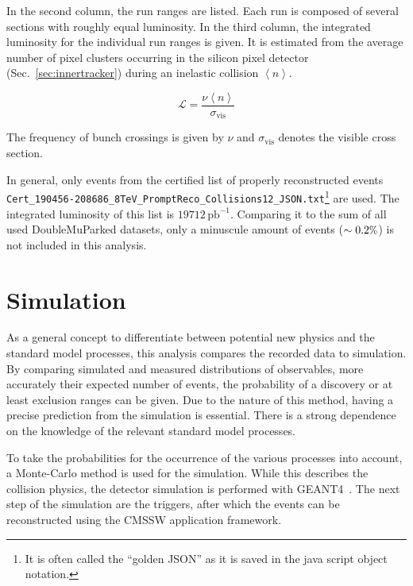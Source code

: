 In the second column, the run ranges are listed. Each run is composed of several sections with roughly equal luminosity. In the third column, the integrated luminosity for the individual run ranges is given. It is estimated from the average number of pixel clusters occurring in the silicon pixel detector (Sec.~\ref{sec:innertracker}) during an inelastic collision $\left< n \right>$.

\begin{equation}
  \label{eq:lumi}
  \mathcal{L} = \frac{\nu \left< n \right>}{\sigma_{\text{vis}}}
\end{equation}

\noindent The frequency of bunch crossings is given by $\nu$ and $\sigma_{\text{vis}}$ denotes the visible cross section. 

In general, only events from the certified list of properly reconstructed events \\ \verb+Cert_190456-208686_8TeV_PromptReco_Collisions12_JSON.txt+\footnote{It is often called the ``golden JSON'' as it is saved in the java script object notation.} are used. The integrated luminosity of this list is $19712\,\text{pb}^{-1}$. Comparing it to the sum of all used DoubleMuParked datasets, only a minuscule amount of events ($\sim 0.2\pct$) is not included in this analysis.

\section{Simulation}

As a general concept to differentiate between potential new physics and the standard model processes, this analysis compares the recorded data to simulation. By comparing simulated and measured distributions of observables, more accurately their expected number of events, the probability of a discovery or at least exclusion ranges can be given. Due to the nature of this method, having a precise prediction from the simulation is essential. There is a strong dependence on the knowledge of the relevant standard model processes.

To take the probabilities for the occurrence of the various processes into account, a Monte-Carlo method is used for the simulation. While this describes the collision physics, the detector simulation is performed with \textsc{GEANT4}~\cite{geant41,geant42}. The next step of the simulation are the triggers, after which the events can be reconstructed using the \textsc{CMSSW} application framework.

